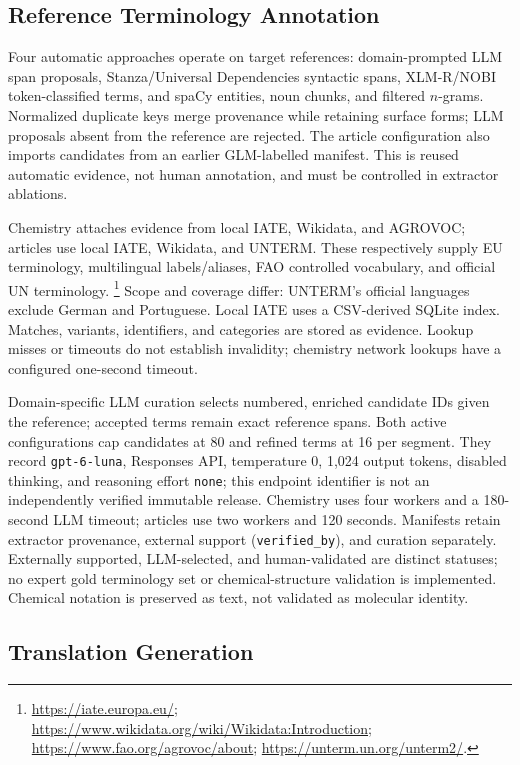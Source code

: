 \documentclass[11pt]{article}
\begin{document}
\subsection{Reference Terminology Annotation}
\label{sec:terminology}

Four automatic approaches operate on target references: domain-prompted LLM span proposals,
Stanza/Universal Dependencies syntactic spans, XLM-R/NOBI token-classified terms, and spaCy entities,
noun chunks, and filtered $n$-grams. Normalized duplicate keys merge provenance while retaining
surface forms; LLM proposals absent from the reference are rejected. The article configuration also
imports candidates from an earlier GLM-labelled manifest. This is reused automatic evidence, not
human annotation, and must be controlled in extractor ablations.

Chemistry attaches evidence from local IATE, Wikidata, and AGROVOC; articles use local IATE,
Wikidata, and UNTERM. These respectively supply EU terminology, multilingual labels/aliases,
FAO controlled vocabulary, and official UN terminology.
\footnote{\url{https://iate.europa.eu/};
\url{https://www.wikidata.org/wiki/Wikidata:Introduction};
\url{https://www.fao.org/agrovoc/about}; \url{https://unterm.un.org/unterm2/}.}
Scope and coverage differ: UNTERM's official languages exclude German and Portuguese. Local IATE
uses a CSV-derived SQLite index. Matches, variants, identifiers, and categories are stored as
evidence. Lookup misses or timeouts do not establish invalidity; chemistry network lookups have
a configured one-second timeout.

Domain-specific LLM curation selects numbered, enriched candidate IDs given the reference;
accepted terms remain exact reference spans. Both active configurations cap candidates at 80 and
refined terms at 16 per segment. They record \texttt{gpt-6-luna}, Responses API, temperature 0,
1,024 output tokens, disabled thinking, and reasoning effort \texttt{none}; this endpoint identifier
is not an independently verified immutable release. Chemistry uses four workers and a 180-second
LLM timeout; articles use two workers and 120 seconds. Manifests retain extractor provenance,
external support (\texttt{verified\_by}), and curation separately. Externally supported, LLM-selected,
and human-validated are distinct statuses; no expert gold terminology set or chemical-structure
validation is implemented. Chemical notation is preserved as text, not validated as molecular identity.

\subsection{Translation Generation}
\label{sec:generation}
\end{document}
